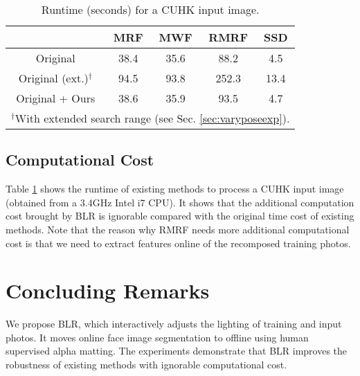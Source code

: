 \documentclass{article}
\renewcommand{\tabcolsep}{.1pt}
\begin{document}
\def\pp{\hspace{2mm}}
\renewcommand{\tabcolsep}{7pt}
\begin{table}
\vspace{-3mm}\caption{Runtime (seconds) for a CUHK input image.}
\centering
\vspace{-3mm}
       \begin{tabular}{ccccc}
        \toprule
        \scriptsize{}&\scriptsize{MRF}\pp&\pp\scriptsize{MWF}\pp&\pp\scriptsize{RMRF}&\pp\scriptsize{SSD}\\
        \midrule
        \scriptsize{Original}&\pp\scriptsize{38.4}&\pp\scriptsize{35.6}\pp&\pp\scriptsize{88.2}&\pp\scriptsize{4.5}\\
        \scriptsize{Original (ext.)$^\dag$}&\pp\scriptsize{94.5}&\pp\scriptsize{93.8}\pp&\pp\scriptsize{252.3}&\pp\scriptsize{13.4}\\
        \scriptsize{Original + Ours}&\pp\scriptsize{38.6}&\pp\scriptsize{35.9}\pp&\pp\scriptsize{93.5}&\pp\scriptsize{4.7}\\
        \bottomrule
        \multicolumn{5}{l}{\scriptsize{$^\dag$With extended search range (see Sec. \ref{sec:varyposeexp}).}}
       \end{tabular}
\label{tab:time}
\end{table}


\subsection{Computational Cost}
Table \ref{tab:time} shows the runtime of existing methods to process a CUHK input image (obtained from a 3.4GHz Intel i7 CPU). It shows that the additional computation cost brought by BLR is ignorable compared with the original time cost of existing methods. Note that the reason why RMRF needs more additional computational cost is that we need to extract features online of the recomposed training photos.


\section{Concluding Remarks}
We propose BLR, which interactively adjusts the lighting of training and input photos. It moves online face image segmentation to offline using human supervised alpha matting. The experiments demonstrate that BLR improves the robustness of existing methods with ignorable computational cost.


\clearpage


\end{document}
